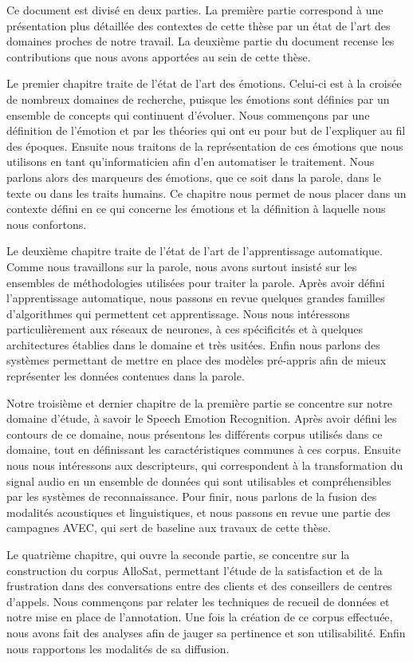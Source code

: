 Ce document est divisé en deux parties. La première partie correspond à une présentation plus détaillée des contextes de cette thèse par un état de l'art des domaines proches de notre travail. La deuxième partie du document recense les contributions que nous avons apportées au sein de cette thèse.

Le premier chapitre traite de l'état de l'art des émotions. Celui-ci est à la croisée de nombreux domaines de recherche, puisque les émotions sont définies par un ensemble de concepts qui continuent d'évoluer. Nous commençons par une définition de l'émotion et par les théories qui ont eu pour but de l'expliquer au fil des époques. Ensuite nous traitons de la représentation de ces émotions que nous utilisons en tant qu'informaticien afin d'en automatiser le traitement. Nous parlons alors des marqueurs des émotions, que ce soit dans la parole, dans le texte ou dans les traits humains. Ce chapitre nous permet de nous placer dans un contexte défini en ce qui concerne les émotions et la définition à laquelle nous nous confortons.

Le deuxième chapitre traite de l'état de l'art de l'apprentissage automatique. Comme nous travaillons sur la parole, nous avons surtout insisté sur les ensembles de méthodologies utilisées pour traiter la parole. Après avoir défini l'apprentissage automatique, nous passons en revue quelques grandes familles d'algorithmes qui permettent cet apprentissage. Nous nous intéressons particulièrement aux réseaux de neurones, à ces spécificités et à quelques architectures établies dans le domaine et très usitées. Enfin nous parlons des systèmes permettant de mettre en place des modèles pré-appris afin de mieux représenter les données contenues dans la parole.

Notre troisième et dernier chapitre de la première partie se concentre sur notre domaine d'étude, à savoir le Speech Emotion Recognition. Après avoir défini les contours de ce domaine, nous présentons les différents corpus utilisés dans ce domaine, tout en définissant les caractéristiques communes à ces corpus. Ensuite nous nous intéressons aux descripteurs, qui correspondent à la transformation du signal audio en un ensemble de données qui sont utilisables et compréhensibles par les systèmes de reconnaissance. Pour finir, nous parlons de la fusion des modalités acoustiques et linguistiques, et nous passons en revue une partie des campagnes AVEC, qui sert de baseline aux travaux de cette thèse.

Le quatrième chapitre, qui ouvre la seconde partie, se concentre sur la construction du corpus AlloSat, permettant l'étude de la satisfaction et de la frustration dans des conversations entre des clients et des conseillers de centres d'appels. Nous commençons par relater les techniques de recueil de données et notre mise en place de l'annotation. Une fois la création de ce corpus effectuée, nous avons fait des analyses afin de jauger sa pertinence et son utilisabilité. Enfin nous rapportons les modalités de sa diffusion.

